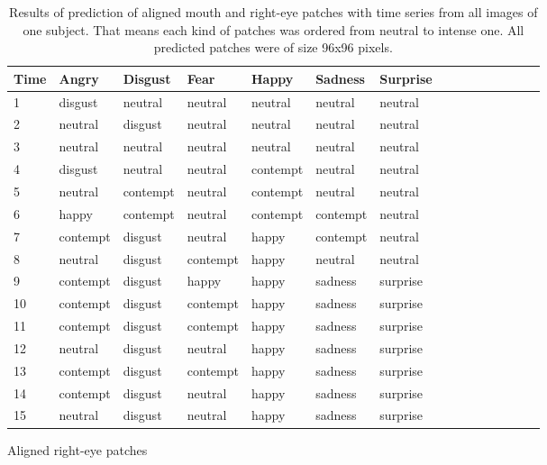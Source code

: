 \begin{table}
    \begin{subtable}{4.7in}
    \begin{tabular}{|*{15}{p{1.34cm}<{\centering}|}|}
    \hline
    Time & Angry &  Disgust  & Fear & Happy & Sadness & Surprise  \\
    \hline
    1 & disgust & neutral & neutral & neutral & neutral & neutral \\
    2 & neutral & disgust & neutral & neutral & neutral & neutral \\
    3 & neutral & neutral & neutral & neutral & neutral & neutral \\
    4 & disgust & neutral & neutral & contempt & neutral & neutral \\
    5 & neutral & contempt & neutral & contempt & neutral & neutral	\\
    6 & happy & contempt & neutral & contempt & contempt & neutral \\
    7 & contempt & disgust & neutral & happy & contempt & neutral \\
    8 & neutral & disgust & contempt & happy & neutral & neutral \\
    9 & contempt & disgust & happy & happy & sadness & surprise \\
    10 & contempt & disgust & contempt & happy & sadness & surprise	\\
    11 & contempt & disgust & contempt & happy & sadness & surprise \\
    12 & neutral & disgust & neutral & happy & sadness & surprise \\
    13 & contempt & disgust & contempt & happy & sadness & surprise \\
    14 & contempt & disgust & neutral & happy & sadness & surprise \\
    15 & neutral & disgust & neutral & happy & sadness & surprise\\

    \hline
    \end{tabular}
    \caption{Aligned right-eye patches}
    \label{table:predict_series:righteye}
    \end{subtable}

\caption[Results of prediction of aligned patches]{Results of prediction of aligned mouth and right-eye patches with time series from all images of one subject. That means each kind of patches was ordered from neutral to intense one. All predicted patches were of size 96x96 pixels. }
\label{table:predict_series}
\end{table}

